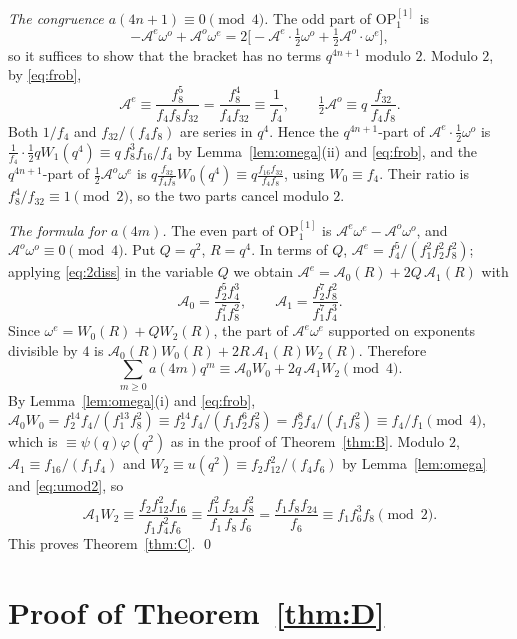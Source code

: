 \documentclass[11pt]{amsart}
\theoremstyle{definition}
\theoremstyle{remark}
\numberwithin{equation}{section}
\newcommand{\OP}{\mathrm{OP}}
\begin{document}
\emph{The congruence $a(4n+1)\equiv0\pmod 4$.} The odd part of $\OP_1^{[1]}$ is
\[
-\mathcal A^{e}\omega^{o}+\mathcal A^{o}\omega^{e}=2\Big[-\mathcal A^{e}\cdot\tfrac12\omega^{o}+\tfrac12\mathcal A^{o}\cdot\omega^{e}\Big],
\]
so it suffices to show that the bracket has no terms $q^{4n+1}$ modulo $2$. Modulo $2$, by \eqref{eq:frob},
\[
\mathcal A^{e}\equiv\frac{f_8^5}{f_4f_8f_{32}}=\frac{f_8^4}{f_4f_{32}}\equiv\frac1{f_4},\qquad \tfrac12\mathcal A^{o}\equiv q\,\frac{f_{32}}{f_4f_8}.
\]
Both $1/f_4$ and $f_{32}/(f_4f_8)$ are series in $q^4$. Hence the $q^{4n+1}$-part of $\mathcal A^{e}\cdot\frac12\omega^{o}$ is $\frac{1}{f_4}\cdot\frac12 qW_1(q^4)\equiv q\,f_8^3f_{16}/f_4$ by Lemma~\ref{lem:omega}(ii) and \eqref{eq:frob}, and the $q^{4n+1}$-part of $\frac12\mathcal A^{o}\omega^{e}$ is $q\frac{f_{32}}{f_4f_8}W_0(q^4)\equiv q\frac{f_{16}f_{32}}{f_4f_8}$, using $W_0\equiv f_4$. Their ratio is $f_8^4/f_{32}\equiv1\pmod 2$, so the two parts cancel modulo $2$.

\emph{The formula for $a(4m)$.} The even part of $\OP_1^{[1]}$ is $\mathcal A^{e}\omega^{e}-\mathcal A^{o}\omega^{o}$, and $\mathcal A^{o}\omega^{o}\equiv0\pmod 4$. Put $Q=q^2$, $R=q^4$. In terms of $Q$, $\mathcal A^{e}=f_4^5/(f_1^2f_2^2f_8^2)$; applying \eqref{eq:2diss} in the variable $Q$ we obtain $\mathcal A^{e}=\mathcal A_0(R)+2Q\,\mathcal A_1(R)$ with
\[
\mathcal A_0=\frac{f_2^5f_4^3}{f_1^7f_8^2},\qquad \mathcal A_1=\frac{f_2^7f_8^2}{f_1^7f_4^3}.
\]
Since $\omega^{e}=W_0(R)+QW_2(R)$, the part of $\mathcal A^{e}\omega^{e}$ supported on exponents divisible by $4$ is $\mathcal A_0(R)W_0(R)+2R\,\mathcal A_1(R)W_2(R)$. Therefore
\[
\sum_{m\ge0}a(4m)q^m\equiv\mathcal A_0W_0+2q\,\mathcal A_1W_2\pmod 4 .
\]
By Lemma~\ref{lem:omega}(i) and \eqref{eq:frob}, $\mathcal A_0W_0=f_2^{14}f_4/(f_1^{13}f_8^2)\equiv f_2^{14}f_4/(f_1f_2^6f_8^2)=f_2^8f_4/(f_1f_8^2)\equiv f_4/f_1\pmod 4$, which is $\equiv\psi(q)\varphi(q^2)$ as in the proof of Theorem~\ref{thm:B}. Modulo $2$, $\mathcal A_1\equiv f_{16}/(f_1f_4)$ and $W_2\equiv u(q^2)\equiv f_2f_{12}^2/(f_4f_6)$ by Lemma~\ref{lem:omega} and \eqref{eq:umod2}, so
\[
\mathcal A_1W_2\equiv\frac{f_2f_{12}^2f_{16}}{f_1f_4^2f_6}\equiv\frac{f_1^2\,f_{24}\,f_8^2}{f_1\,f_8\,f_6}=\frac{f_1f_8f_{24}}{f_6}\equiv f_1f_6^3f_8\pmod 2 .
\]
This proves Theorem~\ref{thm:C}. \qed

\section{Proof of Theorem~\ref{thm:D}}\label{sec:D}
\end{document}
